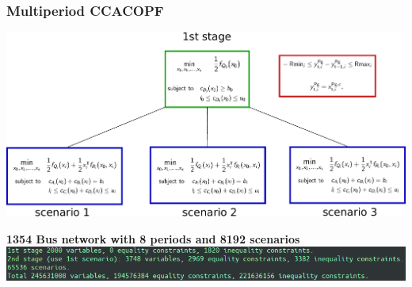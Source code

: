 \begin{frame}
  \frametitle{Multiperiod CCACOPF}
  \begin{center}
    \includegraphics[width=\textwidth]{figures/twostageopt}
  \end{center}
  \begin{center}
  {\bf 1354 Bus network with 8 periods and 8192 scenarios}
    \includegraphics[width=\textwidth]{figures/generators}
  \end{center}
\end{frame}




